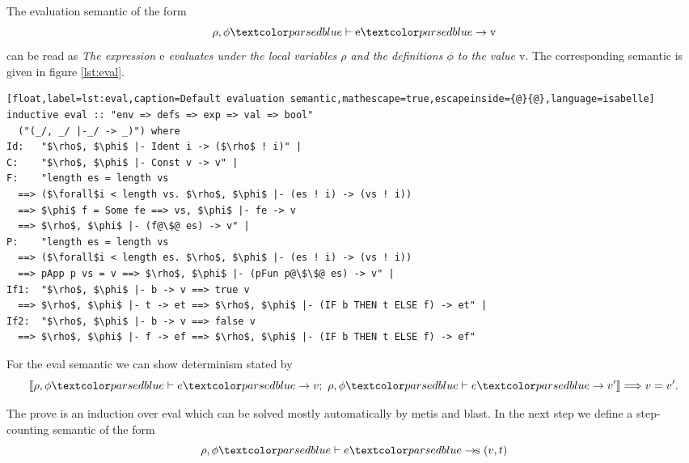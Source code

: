 The evaluation semantic of the form
\begin{equation*}
  \rho, \phi \hvdash \text{e} \hrightarrow \text{v}
\end{equation*}
can be read as \textit{The expression $\text{e}$ evaluates under the local variables $\rho$ and the definitions $\phi$ to the value $\text{v}$}. The corresponding semantic is given in figure \ref{lst:eval}.
\begin{lstlisting}[float,label=lst:eval,caption=Default evaluation semantic,mathescape=true,escapeinside={@}{@},language=isabelle]
inductive eval :: "env => defs => exp => val => bool"
  ("(_/, _/ |-_/ -> _)") where
Id:   "$\rho$, $\phi$ |- Ident i -> ($\rho$ ! i)" |
C:    "$\rho$, $\phi$ |- Const v -> v" |
F:    "length es = length vs
  ==> ($\forall$i < length vs. $\rho$, $\phi$ |- (es ! i) -> (vs ! i))
  ==> $\phi$ f = Some fe ==> vs, $\phi$ |- fe -> v
  ==> $\rho$, $\phi$ |- (f@\$@ es) -> v" |
P:    "length es = length vs
  ==> ($\forall$i < length es. $\rho$, $\phi$ |- (es ! i) -> (vs ! i))
  ==> pApp p vs = v ==> $\rho$, $\phi$ |- (pFun p@\$\$@ es) -> v" |
If1:  "$\rho$, $\phi$ |- b -> v ==> true v
  ==> $\rho$, $\phi$ |- t -> et ==> $\rho$, $\phi$ |- (IF b THEN t ELSE f) -> et" |
If2:  "$\rho$, $\phi$ |- b -> v ==> false v
  ==> $\rho$, $\phi$ |- f -> ef ==> $\rho$, $\phi$ |- (IF b THEN t ELSE f) -> ef"
\end{lstlisting}

For the eval semantic we can show determinism stated by
\begin{equation*}
 \llbracket \rho, \phi \hvdash e \hrightarrow v; \text{ } \rho, \phi \hvdash e \hrightarrow v' \rrbracket \Longrightarrow v = v'.
\end{equation*}

The prove is an induction over eval which can be solved mostly automatically by metis and blast.
In the next step we define a step-counting semantic of the form
\begin{equation*}
  \rho, \phi \hvdash e \hrightarrows (v,t)
\end{equation*}

